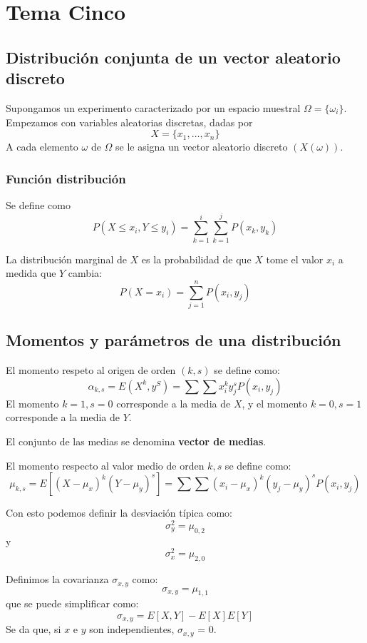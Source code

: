 \documentclass{./Probabilidad.tex}
\begin{document}
\chapter{Tema Cinco}
\section{Distribución conjunta de un vector aleatorio discreto}
Supongamos un experimento caracterizado por un espacio muestral $\Omega = \{ \omega_{i} \}$. Empezamos con variables aleatorias discretas, dadas por 
\[
	X = \{ x_1,\dots ,x_{n} \}
\]
A cada elemento $\omega$ de $\Omega$ se le asigna un vector aleatorio discreto $(X(\omega))$.
\subsection{Función distribución}
Se define como
\[
	P(X \leq x_{i}, Y \leq y_{i}) = \sum^{i}_{k=1}\sum^{j}_{k=1} P(x_{k}, y_{k})
\]
\begin{defin}
	La distribución marginal de $X$ es la probabilidad de que $X$ tome el valor $x_{i}$ a medida que $Y$ cambia:
	\[
		P(X=x_{i}) = \sum_{j=1}^{n} P(x_{i}, y_{j})
	\]
\end{defin}
\section{Momentos y parámetros de una distribución}
\begin{defin}
El momento respeto al origen de orden $(k,s)$ se define como:
\[
 \alpha_{k,s} = E(X^{k}, y^{S}) = \sum \sum x^{k}_{i} y^{s}_{j}P(x_{i}, y_{j})
\]
El momento $k=1, s=0$ corresponde a la media de $X$, y el momento $k=0, s=1$ corresponde a la media de $Y$.

\end{defin}
El conjunto de las medias se denomina \textbf{vector de medias}.
\begin{defin}
El momento respecto al valor medio de orden $k,s$ se define como:
\[
  \mu_{k,s} = E[(X-\mu_{x})^{k}(Y-\mu_{y})^{s}]= \sum \sum (x_{i}-\mu_{x})^{k}(y_{j}-\mu_{y})^{s}P(x_{i},y_{j})
\]
\end{defin}
Con esto podemos definir la desviación típica como:
\[
 \sigma_{ y} ^{2} = \mu_{0,2} 
\]
y
\[
 \sigma_{x} ^{2} = \mu_{2,0} 
\]
\begin{defin}
Definimos la covarianza $\sigma_{x,y}$ como:
\[
  \sigma_{x,y} = \mu_{1,1}
\]
que se puede simplificar como:
\[
  \sigma_{x,y} = E[X,Y] - E[X]E[Y] 
\]
Se da que, si $x$ e $y$ son independientes, $\sigma_{x,y}$ = 0.   
\end{defin}
\end{document}
